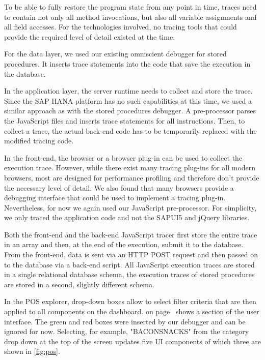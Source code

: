 To be able to fully restore the program state from any point in time, traces need to contain not only all method invocations, but also all variable assignments and all field accesses.
For the technologies involved, no tracing tools that could provide the required level of detail existed at the time.

For the data layer, we used our existing omniscient debugger for stored procedures.%
It inserts trace statements into the code that save the execution in the database.

In the application layer, the server runtime needs to collect and store the trace.
Since the SAP HANA platform has no such capabilities at this time, we used a similar approach as with the stored procedures debugger.
A pre-processor parses the JavaScript files and inserts trace statements for all instructions.
Then, to collect a trace, the actual back-end code has to be temporarily replaced with the modified tracing code.

In the front-end, the browser or a browser plug-in can be used to collect the execution trace.
However, while there exist many tracing plug-ins for all modern browsers, most are designed for performance profiling and therefore don't provide the necessary level of detail.
We also found that many browsers provide a debugging interface that could be used to implement a tracing plug-in.
Nevertheless, for now we again used our JavaScript pre-processor.
For simplicity, we only traced the application code and not the SAPUI5 and jQuery libraries.

Both the front-end and the back-end JavaScript tracer first store the entire trace in an array and then, at the end of the execution, submit it to the database.
From the front-end, data is sent via an HTTP POST request and then passed on to the database via a back-end script.
All JavaScript execution traces are stored in a single relational database schema, the execution traces of stored procedures are stored in a second, slightly different schema.

In the POS explorer, drop-down boxes allow to select filter criteria that are then applied to all components on the dashboard.
 on page~\pageref{fig:pos} shows a section of the user interface.
The green and red boxes were inserted by our debugger and can be ignored for now.
Selecting, for example, "BACONSNACKS" from the category drop down at the top of the screen updates five UI components of which three are shown in \cref{fig:pos}.

